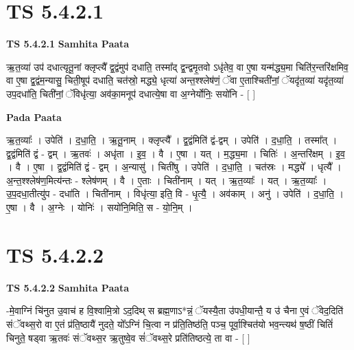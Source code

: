 \documentclass[17pt]{extarticle}
\begin{document}
\section{ TS 5.4.2.1 }

\textbf{TS 5.4.2.1 } \newline
\textbf{Samhita Paata} \newline

ऋ॒त॒व्या॑ उप॑ दधात्यृतू॒नां क्लृप्त्यै᳚ द्व॒द्वंमुप॑ दधाति॒ तस्मा᳚द् द्व॒न्द्वमृ॒तवो ऽधृ॑तेव॒ वा ए॒षा यन्म॑द्ध्य॒मा चिति॑र॒न्तरि॑क्षमिव॒ वा ए॒षा द्व॒द्वंम॒न्यासु॒ चिती॒षूप॑ दधाति॒ चत॑स्रो॒ मद्ध्ये॒ धृत्या॑ अन्त॒श्श्लेष॑णं॒ ॅवा ए॒ताश्चिती॑नां॒ ॅयदृ॑त॒व्या॑ यदृ॑त॒व्या॑ उप॒दधा॑ति॒ चिती॑नां॒ ॅविधृ॑त्या॒ अव॑का॒मनूप॑ दधात्ये॒षा वा अ॒ग्नेर्योनिः॒ सयो॑नि - [  ] \newline

\textbf{Pada Paata} \newline

ऋ॒त॒व्याः᳚ । उपेति॑ । द॒धा॒ति॒ । ऋ॒तू॒नाम् । क्लृप्त्यै᳚ । द्व॒द्वंमिति॑ द्वं-द्वम् । उपेति॑ । द॒धा॒ति॒ । तस्मा᳚त् । द्व॒द्वंमिति॑ द्वं - द्वम् । ऋ॒तवः॑ । अधृ॑ता । इ॒व॒ । वै । ए॒षा । यत् । म॒द्ध्य॒मा । चितिः॑ । अ॒न्तरि॑क्षम् । इ॒व॒ । वै । ए॒षा । द्व॒द्वंमिति॑ द्वं - द्वम् । अ॒न्यासु॑ । चिती॑षु । उपेति॑ । द॒धा॒ति॒ । चत॑स्रः । मद्ध्ये᳚ । धृत्यै᳚ । अ॒न्त॒श्श्लेष॑ण॒मित्य॑न्तः - श्लेष॑णम् । वै । ए॒ताः । चिती॑नाम् । यत् । ऋ॒त॒व्याः᳚ । यत् । ऋ॒त॒व्याः᳚ । उ॒प॒दधा॒तीत्यु॑प - दधा॑ति । चिती॑नाम् । विधृ॑त्या॒ इति॒ वि - धृ॒त्यै॒ । अव॑काम् । अनु॑ । उपेति॑ । द॒धा॒ति॒ । ए॒षा । वै । अ॒ग्नेः । योनिः॑ । सयो॑नि॒मिति॒ स - यो॒नि॒म् ।  \newline





\section{ TS 5.4.2.2 }

\textbf{TS 5.4.2.2 } \newline
\textbf{Samhita Paata} \newline

-मे॒वाग्निं चि॑नुत उ॒वाच॑ ह वि॒श्वामि॒त्रो ऽद॒दिथ् स ब्रह्म॒णाऽ*न्नं॒ ॅयस्यै॒ता उ॑पधी॒यान्तै॒ य उ॑ चैना ए॒वं ॅवेद॒दिति॑ संॅवथ्स॒रो वा ए॒तं प्र॑ति॒ष्ठायै॑ नुदते॒ यो᳚ऽग्निं चि॒त्वा न प्र॑ति॒तिष्ठ॑ति॒ पञ्च॒ पूर्वा॒श्चित॑यो भव॒न्त्यथ॑ ष॒ष्ठीं चितिं॑ चिनुते॒ षड्वा ऋ॒तवः॑ संॅवथ्स॒र ऋ॒तुष्वे॒व सं॑ॅवथ्स॒रे प्रति॑तिष्ठत्ये॒ ता वा - [  ] \newline
\end{document}
